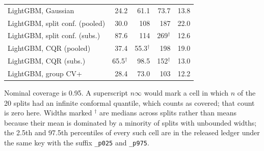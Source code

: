 \begin{table}[!tp]
\begin{tabular}{@{}lrrrr@{}}
\quad LightGBM, Gaussian & 24.2 & 61.1 & 73.7 & 13.8 \\
\quad LightGBM, split conf. (pooled) & 30.0 & 108 & 187 & 22.0 \\
\quad LightGBM, split conf. (subs.) & 87.6 & 114 & 269$^{\dagger}$ & 12.6 \\
\quad LightGBM, CQR (pooled) & 37.4 & 55.3$^{\dagger}$ & 198 & 19.0 \\
\quad LightGBM, CQR (subs.) & 65.5$^{\dagger}$ & 98.5 & 152$^{\dagger}$ & 13.0 \\
\quad LightGBM, group CV+ & 28.4 & 73.0 & 103 & 12.2 \\
\bottomrule
\end{tabular}
\par\smallskip\raggedright\footnotesize Nominal coverage is 0.95. A superscript $n\infty$ would mark a cell in which $n$ of the 20 splits had an infinite conformal quantile, which counts as covered; that count is zero here. Widths marked $^{\dagger}$ are medians across splits rather than means because their mean is dominated by a minority of splits with unbounded widths; the 2.5th and 97.5th percentiles of every such cell are in the released ledger under the same key with the suffix \texttt{\_p025} and \texttt{\_p975}. 
\end{table}
